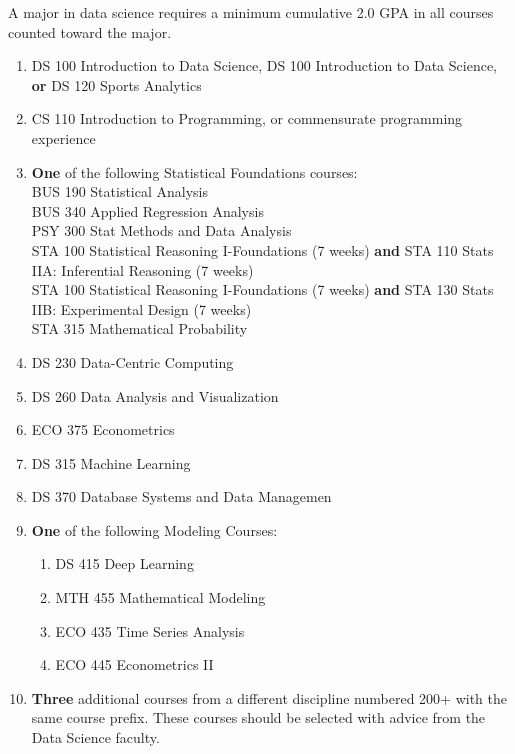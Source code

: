 \documentclass[
  letterpaper,
]{scrbook}
\providecommand{\tightlist}{%
  \setlength{\itemsep}{0pt}\setlength{\parskip}{0pt}}
\begin{document}
A major in data science requires a minimum cumulative 2.0 GPA in all
courses counted toward the major.

\begin{enumerate}
\def\labelenumi{\arabic{enumi}.}
\tightlist
\item
  DS 100 Introduction to Data Science, DS 100 Introduction to Data
  Science, \textbf{or} DS 120 Sports Analytics\\
\item
  CS 110 Introduction to Programming, or commensurate programming
  experience\\
\item
  \textbf{One} of the following Statistical Foundations courses:\\
  BUS 190 Statistical Analysis\\
  BUS 340 Applied Regression Analysis\\
  PSY 300 Stat Methods and Data Analysis\\
  STA 100 Statistical Reasoning I-Foundations (7 weeks) \textbf{and} STA
  110 Stats IIA: Inferential Reasoning (7 weeks)\\
  STA 100 Statistical Reasoning I-Foundations (7 weeks) \textbf{and} STA
  130 Stats IIB: Experimental Design (7 weeks)\\
  STA 315 Mathematical Probability\\
\item
  DS 230 Data-Centric Computing\\
\item
  DS 260 Data Analysis and Visualization\\
\item
  ECO 375 Econometrics\\
\item
  DS 315 Machine Learning\\
\item
  DS 370 Database Systems and Data Managemen\\
\item
  \textbf{One} of the following Modeling Courses:

  \begin{enumerate}
  \def\labelenumii{\alph{enumii}.}
  \tightlist
  \item
    DS 415 Deep Learning\\
  \item
    MTH 455 Mathematical Modeling\\
  \item
    ECO 435 Time Series Analysis\\
  \item
    ECO 445 Econometrics II\\
  \end{enumerate}
\item
  \textbf{Three} additional courses from a different discipline numbered
  200+ with the same course prefix. These courses should be selected
  with advice from the Data Science faculty.
\end{enumerate}
\end{document}
